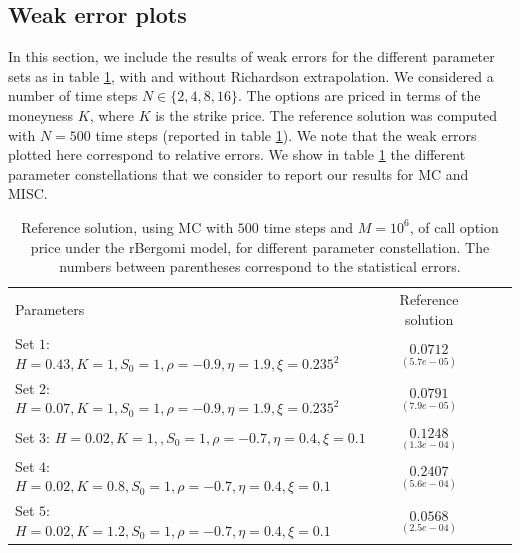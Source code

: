 \begin{enumerate}
	\end{enumerate}

	
	











\subsection{Weak error plots} \label{sec:Weak error plots_no_change}
In this section, we include the results of weak errors for the different parameter sets as in table \ref{table:Reference solution, using MC with $500$ time steps, of Call option price under rBergomi model, for different parameter constellation.}, with and without Richardson extrapolation.  We considered a number of time steps $N \in \{2,4,8,16\}$.  The options are priced in terms of the moneyness $K$, where $K$ is the strike price.  The reference solution was computed with $N=500$ time steps (reported in table \ref{table:Reference solution, using MC with $500$ time steps, of Call option price under rBergomi model, for different parameter constellation.}). We note that the weak errors plotted here correspond to relative errors. We show in table \ref{table:Reference solution, using MC with $500$ time steps, of Call option price under rBergomi model, for different parameter constellation.} the different parameter constellations that we consider to report our results for MC and MISC.



\begin{table}[!h]
	\centering
	\begin{small}
	\begin{tabular}{l*{2}{c}r}
		Parameters            & Reference solution    \\
	Set $1$:	$H=0.43, K=1,S_0=1, \rho=-0.9, \eta=1.9,\xi=0.235^2$   & $\underset{(5.7e-05)}{0.0712}$  \\	
			Set $2$:	$H=0.07, K=1,S_0=1, \rho=-0.9, \eta=1.9,\xi=0.235^2$   & $\underset{(7.9e-05)}{0.0791}$  \\	

				Set $3$:	$H=0.02, K=1,,S_0=1, \rho=-0.7, \eta=0.4,\xi=0.1$   & $\underset{(1.3e-04)}{0.1248}$  \\
					Set $4$:	$H=0.02, K=0.8,S_0=1, \rho=-0.7, \eta=0.4,\xi=0.1$   & $\underset{(5.6e-04)}{0.2407}$  \\
						Set $5$:	$H=0.02, K=1.2,S_0=1, \rho=-0.7, \eta=0.4,\xi=0.1$   & $\underset{(2.5e-04)}{0.0568}$  \\
		\hline
	\end{tabular}
\end{small}
	\caption{Reference solution, using MC with $500$ time steps and $M=10^6$, of call option price under the rBergomi model, for different parameter constellation.  The numbers between parentheses correspond to the statistical errors.}
	\label{table:Reference solution, using MC with $500$ time steps, of Call option price under rBergomi model, for different parameter constellation.}
\end{table}


